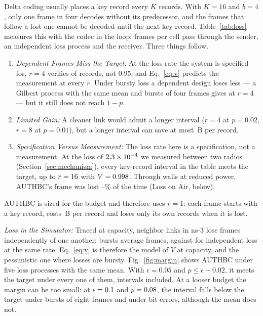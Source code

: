 \documentclass[lineno,pdflatex,sn-mathphys-num]{sn-jnl}
\newcommand{\runin}[1]{\textit{#1:}}
\renewcommand{\_}{\authbcunderscore\allowbreak}
\begin{document}
Delta coding usually places a key record every $K$ records. With $K=16$ and $b=4$, only one frame
in four decodes without its predecessor, and the frames that follow a lost one cannot be decoded
until the next key record. Table~\ref{tab:loss} measures this with the codec in the loop:
\lossFrames{} frames per cell pass through the sender, an independent loss process and the
receiver. Three things follow.
\begin{enumerate}
\item \runin{Dependent Frames Miss the Target} At the loss rate the system is specified for,
$r=4$ verifies \lossVFour{} of records, not 0.95, and Eq.~\eqref{eq:v} predicts the measurement at
every $r$. Under bursty loss a dependent design loses less --- a Gilbert process with the same
mean and bursts of four frames gives \lossVFourBurst{} at $r=4$ --- but it still does not reach
$1-p$.
\item \runin{Limited Gain} A cleaner link would admit a longer interval ($r=4$ at $p=0.02$, $r=8$
at $p=0.01$), but a longer interval can save at most \lossPrize\,B per record.
\item \runin{Specification Versus Measurement} The loss rate here is a specification, not a
measurement. At the loss of $2.3\times10^{-4}$ we measured between two radios
(Section~\ref{sec:mechanism}), every key-record interval in the table meets the target, up to
$r=16$ with $V=0.998$. Through walls at reduced power, AUTHBC's frame was lost
\airLossMinA--\airLossMaxA\% of the time (Loss on Air, below).
\end{enumerate}
AUTHBC is sized for the budget and therefore uses $r=1$: each frame starts with a key record,
costs \bprLeanDesign\,B per record and loses only its own records when it is lost.

\runin{Loss in the Simulator} Traced at capacity, \trLinks{} neighbor links in ns-3 lose frames
independently of one another: bursts average \trBurst{} frames, against \trBurstIid{} for
independent loss at the same rate. Eq.~\eqref{eq:v} is therefore the model of $V$ at capacity,
and the pessimistic one where losses are bursty. Fig.~\ref{fig:margin} shows AUTHBC under five
loss processes with the same mean. With $\epsilon = 0.05$ and $p \leq \epsilon - 0.02$, it meets
the target under every one of them, intervals included. At a looser budget the margin can be too
small: at $\epsilon = 0.1$ and $p = 0.08$, the interval falls below the target under
bursts of eight frames and under bit errors, although the mean does not.
\end{document}
